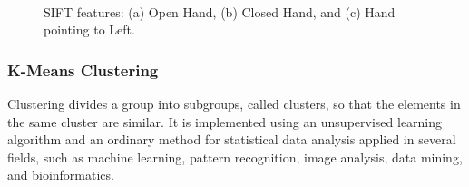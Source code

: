 \begin{figure}[]
\begin{dBox}
\centering
  \mbox{
   }
   \caption{SIFT features: (a) Open Hand, (b) Closed Hand, and (c) Hand pointing to Left. \label{fig:sift_example} }   
\end{dBox}   
\end{figure}
\bigskip

\subsubsection{K-Means Clustering} 
Clustering divides a group into subgroups, called clusters, so that the elements in the 
same cluster are similar. It is implemented using an unsupervised learning algorithm and an 
ordinary method for statistical data analysis applied in several fields, such as machine learning, 
pattern recognition, image analysis, data mining, and bioinformatics.
\bigskip

